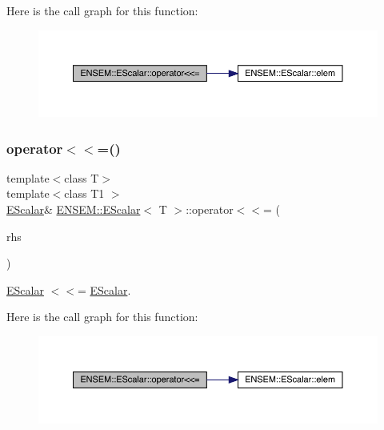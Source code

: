 Here is the call graph for this function\+:
\nopagebreak
\begin{figure}[H]
\begin{center}
\leavevmode
\includegraphics[width=350pt]{d0/d82/classENSEM_1_1EScalar_a29ea96dc5698e4541307d65a0f1dfe6e_cgraph}
\end{center}
\end{figure}
\mbox{\label{classENSEM_1_1EScalar_a29ea96dc5698e4541307d65a0f1dfe6e}} 
\subsubsection{\texorpdfstring{operator$<$$<$=()}{operator<<=()}\hspace{0.1cm}{\footnotesize\ttfamily [2/3]}}
{\footnotesize\ttfamily template$<$class T$>$ \\
template$<$class T1 $>$ \\
\mbox{\hyperlink{classENSEM_1_1EScalar}{E\+Scalar}}\& \mbox{\hyperlink{classENSEM_1_1EScalar}{E\+N\+S\+E\+M\+::\+E\+Scalar}}$<$ T $>$\+::operator$<$$<$= (\begin{DoxyParamCaption}\item[{const \mbox{\hyperlink{classENSEM_1_1EScalar}{E\+Scalar}}$<$ T1 $>$ \&}]{rhs }\end{DoxyParamCaption})\hspace{0.3cm}{\ttfamily [inline]}}



\mbox{\hyperlink{classENSEM_1_1EScalar}{E\+Scalar}} $<$$<$= \mbox{\hyperlink{classENSEM_1_1EScalar}{E\+Scalar}}. 

Here is the call graph for this function\+:
\nopagebreak
\begin{figure}[H]
\begin{center}
\leavevmode
\includegraphics[width=350pt]{d0/d82/classENSEM_1_1EScalar_a29ea96dc5698e4541307d65a0f1dfe6e_cgraph}
\end{center}
\end{figure}
\mbox{\label{classENSEM_1_1EScalar_a29ea96dc5698e4541307d65a0f1dfe6e}} 
